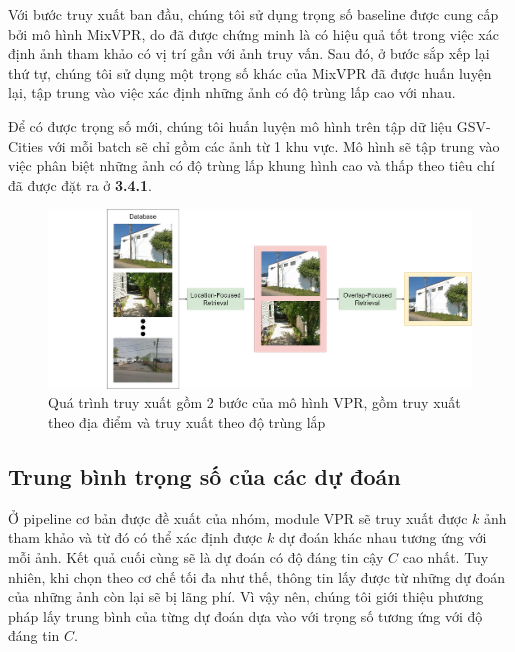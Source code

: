 Với bước truy xuất ban đầu, chúng tôi sử dụng trọng số baseline được cung cấp bởi mô hình MixVPR, do đã được chứng minh là có hiệu quả tốt trong việc xác định ảnh tham khảo có vị trí gần với ảnh truy vấn. Sau đó, ở bước sắp xếp lại thứ tự, chúng tôi sử dụng một trọng số khác của MixVPR đã được huấn luyện lại, tập trung vào việc xác định những ảnh có độ trùng lấp cao với nhau. 

Để có được trọng số mới, chúng tôi huấn luyện mô hình trên tập dữ liệu GSV-Cities \cite{Ali_bey_2022} với mỗi batch sẽ chỉ gồm các ảnh từ 1 khu vực. Mô hình sẽ tập trung vào việc phân biệt những ảnh có độ trùng lấp khung hình cao và thấp theo tiêu chí đã được đặt ra ở \textbf{3.4.1}.

\begin{figure}
  \centering
  \includegraphics[width=\textwidth]{pics/Proposal/rerank.drawio.png}
  \caption[Quá trình truy xuất 2 bước của VPR]{Quá trình truy xuất gồm 2 bước của mô hình VPR, gồm truy xuất theo địa điểm và truy xuất theo độ trùng lắp}
\end{figure}

\subsection{Trung bình trọng số của các dự đoán}

Ở pipeline cơ bản được đề xuất của nhóm, module VPR sẽ truy xuất được $k$ ảnh tham khảo và từ đó có thể xác định được $k$ dự đoán khác nhau tương ứng với mỗi ảnh. Kết quả cuối cùng sẽ là dự đoán có độ đáng tin cậy $C$ cao nhất. Tuy nhiên, khi chọn theo cơ chế tối đa như thế, thông tin lấy được từ những dự đoán của những ảnh còn lại sẽ bị lãng phí. Vì vậy nên, chúng tôi giới thiệu phương pháp lấy trung bình của từng dự đoán dựa vào với trọng số tương ứng với độ đáng tin $C$.

